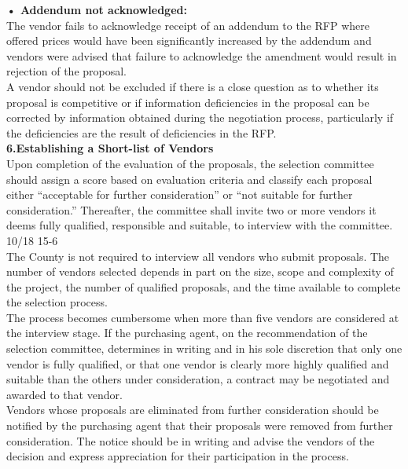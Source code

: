 \documentclass[12pt]{article}
\begin{document}
\textbf{• Addendum not acknowledged:} \\The vendor fails to acknowledge receipt of
an addendum to the RFP where offered prices would have been
significantly increased by the addendum and vendors were advised that
failure to acknowledge the amendment would result in rejection of the
proposal.
\\A vendor should not be excluded if there is a close question as to whether its
proposal is competitive or if information deficiencies in the proposal can be
corrected by information obtained during the negotiation process, particularly if
the deficiencies are the result of deficiencies in the RFP. \\
\textbf{6.Establishing a Short-list of Vendors}
\\Upon completion of the evaluation of the proposals, the selection committee
should assign a score based on evaluation criteria and classify each proposal
either “acceptable for further consideration” or “not suitable for further
consideration.” Thereafter, the committee shall invite two or more vendors it
deems fully qualified, responsible and suitable, to interview with the committee. 
10/18 15-6
\\The County is not required to interview all vendors who submit proposals. The
number of vendors selected depends in part on the size, scope and complexity
of the project, the number of qualified proposals, and the time available to complete the selection process. \\The process becomes cumbersome when more
than five vendors are considered at the interview stage.
If the purchasing agent, on the recommendation of the selection committee,
determines in writing and in his sole discretion that only one vendor is fully
qualified, or that one vendor is clearly more highly qualified and suitable than the
others under consideration, a contract may be negotiated and awarded to that
vendor.
\\Vendors whose proposals are eliminated from further consideration should be
notified by the purchasing agent that their proposals were removed from further
consideration. The notice should be in writing and advise the vendors of the
decision and express appreciation for their participation in the process. 
\end{document}
